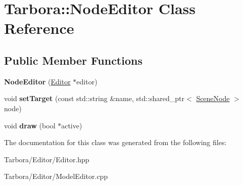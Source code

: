 \hypertarget{classTarbora_1_1NodeEditor}{}\section{Tarbora\+:\+:Node\+Editor Class Reference}
\label{classTarbora_1_1NodeEditor}
\subsection*{Public Member Functions}
\begin{DoxyCompactItemize}
\item 
\mbox{\label{classTarbora_1_1NodeEditor_a033499555046f05215af8c49613cad91}} 
{\bfseries Node\+Editor} (\hyperlink{classTarbora_1_1Editor}{Editor} $\ast$editor)
\item 
\mbox{\label{classTarbora_1_1NodeEditor_a552bc410505fdd42c3a9c3e5b57f3ea6}} 
void {\bfseries set\+Target} (const std\+::string \&name, std\+::shared\+\_\+ptr$<$ \hyperlink{classTarbora_1_1SceneNode}{Scene\+Node} $>$ node)
\item 
\mbox{\label{classTarbora_1_1NodeEditor_ac7f07b963a9e2c0553ed31e66faa5f47}} 
void {\bfseries draw} (bool $\ast$active)
\end{DoxyCompactItemize}


The documentation for this class was generated from the following files\+:\begin{DoxyCompactItemize}
\item 
Tarbora/\+Editor/Editor.\+hpp\item 
Tarbora/\+Editor/Model\+Editor.\+cpp\end{DoxyCompactItemize}
